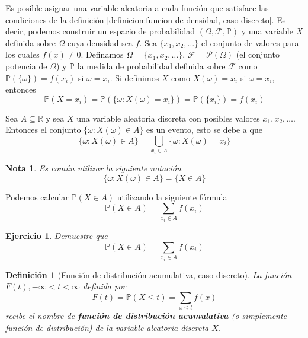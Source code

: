 \documentclass[11pt]{report}
\theoremstyle{break}
\newtheorem{definicion}{Definición}[chapter]
\newtheorem{nota}{Nota}[chapter]
\newtheorem{ejercicio}{Ejercicio}[chapter]
\theoremstyle{break}
\begin{document}
Es posible asignar una variable aleatoria a cada función que satisface las condiciones de la definición \ref{definicion:funcion de densidad, caso discreto}. Es decir, podemos construir un espacio de probabilidad $(\Omega, \mathcal{F}, \mathbb{P})$ y una variable $X$ definida sobre $\Omega$ cuya densidad sea $f$. Sea $\{x_1, x_2, \ldots \}$ el conjunto de valores para los cuales $f(x) \neq 0$. Definamos $\Omega = \{x_1, x_2, \ldots \}$, $\mathcal{F} = \mathcal{P}(\Omega)$ (el conjunto potencia de $\Omega$) y $\mathbb{P}$ la medida de probabilidad definida sobre $\mathcal{F}$ como $\mathbb{P}( \{\omega \} ) = f(x_i)$ si $\omega = x_i$. Si definimos $X$ como $X(\omega) = x_i$ si $\omega = x_i$, entonces
$$
\mathbb{P}(X = x_i) = \mathbb{P}(\{\omega: X(\omega) = x_i \}) = \mathbb{P}(\{x_i\}) = f(x_i)
$$

Sea $A \subseteq \mathbb{R}$ y sea $X$ una variable aleatoria discreta con posibles valores $x_1, x_2, \ldots$. Entonces el conjunto $\{\omega: X(\omega) \in A  \}$ es un evento, esto se debe a que
$$
\{\omega: X(\omega) \in A  \} = \bigcup_{x_i \in A} \{\omega: X(\omega) = x_i \}
$$
\begin{nota}
Es común utilizar la siguiente notación
$$
\{\omega: X(\omega) \in A  \} = \{X \in A\}
$$
\end{nota}
Podemos calcular $\mathbb{P}(X \in A)$ utilizando la siguiente fórmula
$$
\mathbb{P}(X \in A) = \sum_{x_i \in A}f(x_i)
$$

\begin{ejercicio}
Demuestre que 
$$
\mathbb{P}(X \in A) = \sum_{x_i \in A}f(x_i)
$$
\end{ejercicio}

\begin{definicion}[Función de distribución acumulativa, caso discreto]
\label{definicion:funcion de distribucion caso discreto}
La función $F(t), -\infty < t < \infty$ definida por
$$
F(t) = \mathbb{P}(X \leq t) = \sum_{x \leq t} f(x)
$$
recibe el nombre de \textbf{función de distribución acumulativa} (o simplemente función de distribución) de la variable aleatoria discreta $X$.
\end{definicion}
\end{document}
